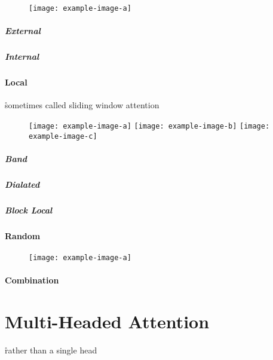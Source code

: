\begin{figure}[htp]
	\centering
	\texttt{[image: example-image-a]}\hfil
	\caption{}
	\label{fig:attn_global}
\end{figure}


\paragraph{External}

\paragraph{Internal}


\subsubsection{Local}

\r{sometimes called sliding window attention}

\begin{figure}[htp]
	\centering
	\texttt{[image: example-image-a]}\hfil
	\texttt{[image: example-image-b]}\hfil
	\texttt{[image: example-image-c]}\hfil
	\caption{}
	\label{fig:attn_diagonal}
\end{figure}

\paragraph{Band}

\paragraph{Dialated}

\paragraph{Block Local}

\subsubsection{Random}

\begin{figure}[htp]
	\centering
	\texttt{[image: example-image-a]}\hfil
	\caption{}
	\label{fig:attn_random}
\end{figure}

\subsubsection{Combination}




\chapter{Multi-Headed Attention}

\r{rather than a single head}



